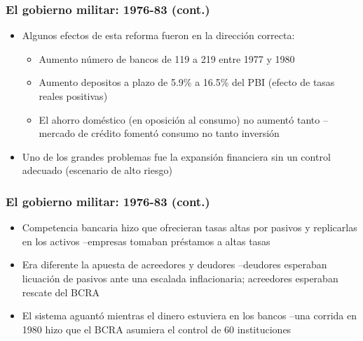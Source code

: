 \documentclass[14pt,aspectratio=169]{beamer}
\begin{document}
\begin{frame}\frametitle{El gobierno militar: 1976-83 (cont.)}
                 \begin{itemize}\itemsep 5pt \medskip
                 \item Algunos efectos de esta reforma fueron en la
                   dirección correcta:
                   \begin{itemize}\itemsep 5pt \medskip
                     \item Aumento número de bancos de 119 a 219 entre
                       1977 y 1980
                       \item Aumento depositos a plazo de 5.9\% a
                         16.5\% del PBI (efecto de tasas reales
                         positivas)
                         \item El ahorro doméstico (en oposición al
                           consumo) no aumentó tanto --mercado de
                           crédito fomentó consumo no tanto inversión
                         \end{itemize}
                       \item Uno de los grandes problemas fue la
                         expansión financiera sin un control adecuado
                         (escenario de alto riesgo)
                         \end{itemize}
               \end{frame}



               \begin{frame}\frametitle{El gobierno militar: 1976-83 (cont.)}
                 \begin{itemize}\itemsep 5pt \medskip
                 \item Competencia bancaria hizo que ofrecieran tasas
                   altas por pasivos y replicarlas en los activos
                   --empresas tomaban préstamos a altas tasas
                   \item Era diferente la apuesta de acreedores y
                     deudores --deudores esperaban licuación de
                     pasivos ante una escalada inflacionaria;
                     acreedores esperaban rescate del BCRA
                     \item El sistema aguantó mientras el dinero
                       estuviera en los bancos --una corrida en 1980
                       hizo que el BCRA asumiera el control de 60 instituciones
                   \end{itemize} 
               \end{frame}
               
\end{document}
